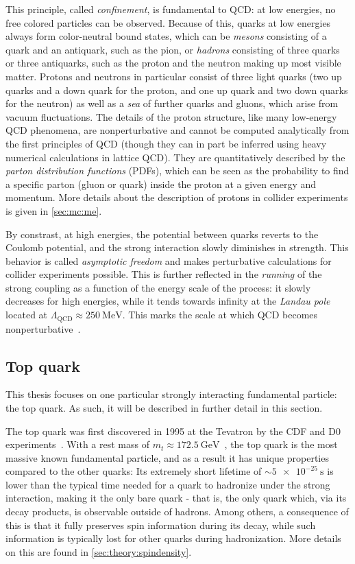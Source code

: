 This principle, called \textit{confinement}, is fundamental to QCD: at low energies, no free colored particles can be observed. Because of this, quarks at low energies always form color-neutral bound states, which can be \textit{mesons} consisting of a quark and an antiquark, such as the pion, or \textit{hadrons} consisting of three quarks or three antiquarks, such as the proton and the neutron making up most visible matter. Protons and neutrons in particular consist of three light quarks (two up quarks and a down quark for the proton, and one up quark and two down quarks for the neutron) as well as a \textit{sea} of further quarks and gluons, which arise from vacuum fluctuations. The details of the proton structure, like many low-energy QCD phenomena, are nonperturbative and cannot be computed analytically from the first principles of QCD (though they can in part be inferred using heavy numerical calculations in lattice QCD). They are quantitatively described by the \textit{parton distribution functions} (PDFs), which can be seen as the probability to find a specific parton (gluon or quark) inside the proton at a given energy and momentum. More details about the description of protons in collider experiments is given in \cref{sec:mc:me}.

By constrast, at high energies, the potential between quarks reverts to the Coulomb potential, and the strong interaction slowly diminishes in strength. This behavior is called \textit{asymptotic freedom} and makes perturbative calculations for collider experiments possible. This is further reflected in the \textit{running} of the strong coupling \alphas as a function of the energy scale of the process: it slowly decreases for high energies, while it tends towards infinity at the \textit{Landau pole} located at $\Lambda_{\mathrm{QCD}} \approx \SI{250}{\MeV}$. This marks the scale at which QCD becomes nonperturbative~\cite{Peskin:1995ev,Skands:2012ts}.

\subsection{Top quark}

This thesis focuses on one particular strongly interacting fundamental particle: the top quark. As such, it will be described in further detail in this section.

The top quark was first discovered in 1995 at the Tevatron by the CDF and D0 experiments~\cite{CDF:1995wbb,D0:1995jca}. With a rest mass of $m_t \approx \SI{172.5}{\GeV}$~\cite{ATLASCMS:2024dxp}, the top quark is the most massive known fundamental particle, and as a result it has unique properties compared to the other quarks: Its extremely short lifetime of $\sim \SI{5e-25}{\s}$ is lower than the typical time needed for a quark to hadronize under the strong interaction, making it the only bare quark - that is, the only quark which,  via its decay products, is observable outside of hadrons. Among others, a consequence of this is that it fully preserves spin information during its decay, while such information is typically lost for other quarks during hadronization. More details on this are found in \cref{sec:theory:spindensity}.

